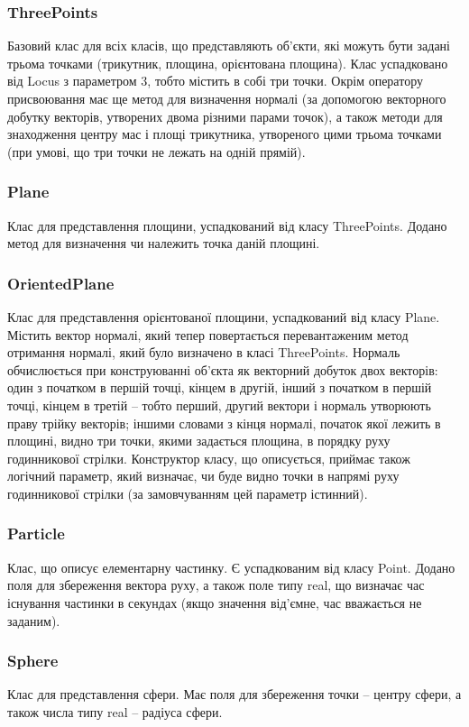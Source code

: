 \documentclass[a4paper,12pt]{article}
\begin{document}
\subsubsection{ThreePoints}
Базовий клас для всіх класів, що представляють об’єкти, які можуть бути задані трьома точками (трикутник, площина, орієнтована площина). Клас успадковано від Locus з параметром 3, тобто містить в собі три точки. Окрім оператору присвоювання має ще метод для визначення нормалі (за допомогою векторного добутку векторів, утворених двома різними парами точок), а також методи для знаходження центру мас і площі трикутника, утвореного цими трьома точками (при умові, що три точки не лежать на одній прямій).

\subsubsection{Plane}
Клас для представлення площини, успадкований від класу ThreePoints. Додано метод для визначення чи належить точка даній площині.

\subsubsection{OrientedPlane}
Клас для представлення орієнтованої площини, успадкований від класу Plane. Містить вектор нормалі, який тепер повертається перевантаженим метод отримання нормалі, який було визначено в класі ThreePoints. Нормаль обчислюється при конструюванні об’єкта як векторний добуток двох векторів: один з початком в першій точці, кінцем в другій, інший з початком в першій точці, кінцем в третій  -- тобто перший, другий вектори і нормаль утворюють праву трійку векторів; іншими словами з кінця нормалі, початок якої лежить в площині, видно три точки, якими задається площина, в порядку руху годинникової стрілки. Конструктор класу, що описується, приймає також логічний параметр, який визначає, чи буде видно точки в напрямі руху годинникової стрілки (за замовчуванням цей параметр істинний).

\subsubsection{Particle}
Клас, що описує елементарну частинку. Є успадкованим від класу Point. Додано поля для збереження вектора руху, а також поле типу real, що визначає час існування частинки в секундах (якщо значення від’ємне, час вважається не заданим).

\subsubsection{Sphere}
Клас для представлення сфери. Має поля для збереження точки -- центру сфери, а також числа типу real -- радіуса сфери.
\end{document}

